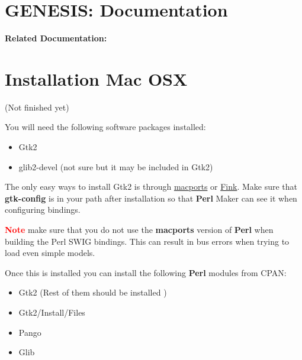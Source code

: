 \documentclass[12pt]{article}
\begin{document}
\section*{GENESIS: Documentation}

{\bf Related Documentation:}


\section*{Installation Mac OSX} (Not finished yet)


You will need the following software packages installed:

\begin{itemize}
\item[] Gtk2
\item[] glib2-devel (not sure but it may be included in Gtk2)
\end{itemize}

The only easy ways to install Gtk2 is through \href{http://www.macports.org/}{macports} or \href{http://www.finkproject.org/}{Fink}. Make sure that {\bf gtk-config} is in your path after installation so that {\bf Perl} Maker can see it when configuring bindings. 

\textcolor{red}{\bf Note} make sure that you do not use the {\bf macports} version of {\bf Perl} when building the Perl SWIG bindings. This can result in bus errors when trying to load even simple models.

Once this is installed you can install the following {\bf Perl} modules from CPAN:

\begin{itemize}
\item[] Gtk2 (Rest of them should be installed )
\item[] Gtk2/Install/Files
\item[] Pango
\item[] Glib
\end{itemize}
\end{document}
